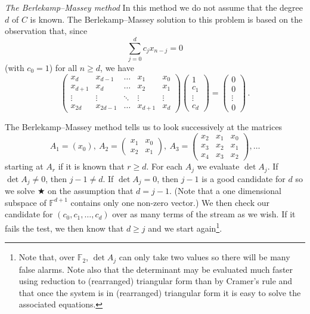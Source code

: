 \documentclass[12pt,a4paper]{article}
\theoremstyle{plain}
\theoremstyle{definition}
\begin{document}
    \noindent\emph{The Berlekamp--Massey method}
    In this method we do not assume that
    the degree $d$ of $C$ is known.
    The Berlekamp--Massey solution to this problem
    is based on the observation that, since
    \[\sum_{j=0}^{d}c_{j}x_{n-j}=0\]
    (with $c_{0}=1$)
    for all $n\geq d$, we have
    \begin{equation*}
        \begin{pmatrix}
            x_{d}&x_{d-1}&\dots&x_{1}&x_{0}\\
            x_{d+1}&x_{d}&\dots&x_{2}&x_{1}\\
            \vdots&\vdots&\ddots&\vdots&\vdots\\
            x_{2d}&x_{2d-1}&\dots&x_{d+1}&x_{d}
        \end{pmatrix}
        \begin{pmatrix}
            1\\c_{1}\\ \vdots\\c_{d}
        \end{pmatrix}
        =\begin{pmatrix}
             0\\0\\ \vdots\\0
        \end{pmatrix}\,.
        \tag*{$\bigstar$}
    \end{equation*}

    The Berlekamp--Massey method
    tells us to look successively
    at the matrices
    \[A_{1}=(x_{0}),
    \ A_{2}=
    \begin{pmatrix}
        x_{1}&x_{0}\\
        x_{2}&x_{1}
    \end{pmatrix},
    \ A_{3}=
    \begin{pmatrix}
        x_{2}&x_{1}&x_{0}\\
        x_{3}&x_{2}&x_{1}\\
        x_{4}&x_{3}&x_{2}
    \end{pmatrix},
    \dots
    \]
    starting at $A_{r}$ if it is known that $r\geq d$.
    For each $A_{j}$ we evaluate $\det A_{j}$.
    If $\det A_{j}\neq 0$, then $j-1\neq d$.
    If $\det A_{j}=0$, then $j-1$ is a good candidate
    for $d$ so we solve $\bigstar$ on the assumption that
    $d=j-1$. (Note that a one dimensional subspace of
    ${\mathbb F}^{d+1}$ contains only one non-zero
    vector.) We then check our candidate for
    $(c_{0},c_{1},\dots,c_{d})$ over as many
    terms of the stream as we wish. If it fails the
    test, we then know that $d\geq j$ and we start
    again\footnote{Note that, over ${\mathbb F}_{2}$,
    $\det A_{j}$ can only take two values so there will
    be many false alarms. Note also that the determinant
    may be evaluated much faster using reduction to
    (rearranged) triangular form than by Cramer's rule
    and that once the system is in (rearranged) triangular form
    it is easy to solve the associated equations.}.
\end{document}
